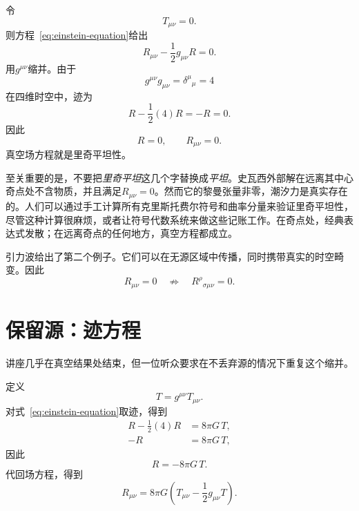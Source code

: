 令
\begin{equation}
 T_{\mu\nu}=0.
\end{equation}
则方程~\eqref{eq:einstein-equation}给出
\begin{equation}
 R_{\mu\nu}-\frac12g_{\mu\nu}R=0.
 \label{eq:vacuum-einstein}
\end{equation}
用\(g^{\mu\nu}\)缩并。由于
\begin{equation}
 g^{\mu\nu}g_{\mu\nu}
 =\delta^\mu{}_\mu=4
\end{equation}
在四维时空中，迹为
\begin{equation}
 R-\frac12(4)R=-R=0.
\end{equation}
因此
\begin{equation}
 R=0,
 \qquad
 R_{\mu\nu}=0.
 \label{eq:ricci-flat}
\end{equation}
真空场方程就是里奇平坦性。

至关重要的是，不要把\emph{里奇平坦}这几个字替换成\emph{平坦}。史瓦西外部解在远离其中心奇点处不含物质，并且满足\(R_{\mu\nu}=0\)。然而它的黎曼张量非零，潮汐力是真实存在的。人们可以通过手工计算所有克里斯托费尔符号和曲率分量来验证里奇平坦性，尽管这种计算很麻烦，或者让符号代数系统来做这些记账工作。在奇点处，经典表达式发散；在远离奇点的任何地方，真空方程都成立。

引力波给出了第二个例子。它们可以在无源区域中传播，同时携带真实的时空畸变。因此
\begin{equation}
 R_{\mu\nu}=0
 \quad\not\Rightarrow\quad
 R^\rho{}_{\sigma\mu\nu}=0.
\end{equation}

\section{保留源：迹方程}

讲座几乎在真空结果处结束，但一位听众要求在不丢弃源的情况下重复这个缩并。

\begin{classroomqa}
\end{classroomqa}

定义
\begin{equation}
 T=g^{\mu\nu}T_{\mu\nu}.
\end{equation}
对式~\eqref{eq:einstein-equation}取迹，得到
\begin{align}
 R-\frac12(4)R&=8\pi G\,T,\\
 -R&=8\pi G\,T,
\end{align}
因此
\begin{equation}
 \boxed{R=-8\pi G\,T}.
 \label{eq:trace-relation}
\end{equation}
代回场方程，得到
\begin{equation}
 \boxed{
 R_{\mu\nu}
 =
 8\pi G
 \left(
 T_{\mu\nu}-\frac12g_{\mu\nu}T
 \right)
 }.
 \label{eq:ricci-form}
\end{equation}

